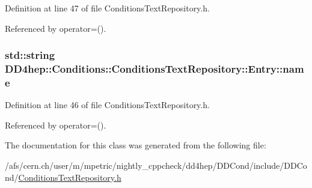 Definition at line 47 of file ConditionsTextRepository.h.

Referenced by operator=().\hypertarget{class_d_d4hep_1_1_conditions_1_1_conditions_text_repository_1_1_entry_aacad5506cc8e8f5d9369ff635371a1f6}{
\subsubsection[{name}]{\setlength{\rightskip}{0pt plus 5cm}std::string {\bf DD4hep::Conditions::ConditionsTextRepository::Entry::name}}}
\label{class_d_d4hep_1_1_conditions_1_1_conditions_text_repository_1_1_entry_aacad5506cc8e8f5d9369ff635371a1f6}


Definition at line 46 of file ConditionsTextRepository.h.

Referenced by operator=().

The documentation for this class was generated from the following file:\begin{DoxyCompactItemize}
\item 
/afs/cern.ch/user/m/mpetric/nightly\_\-cppcheck/dd4hep/DDCond/include/DDCond/\hyperlink{_conditions_text_repository_8h}{ConditionsTextRepository.h}\end{DoxyCompactItemize}
